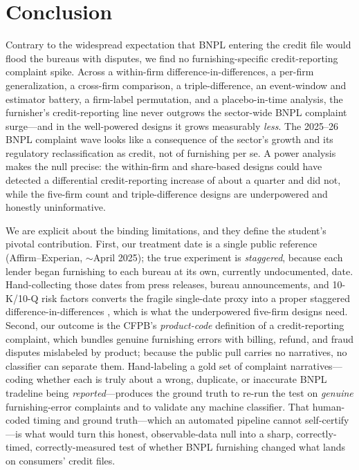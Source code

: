 \documentclass[12pt]{article}
\begin{document}
\section{Conclusion}\label{sec:concl}
Contrary to the widespread expectation that BNPL entering the credit file would flood the
bureaus with disputes, we find no furnishing-specific credit-reporting complaint spike. Across a
within-firm difference-in-differences, a per-firm generalization, a cross-firm comparison, a
triple-difference, an event-window and estimator battery, a firm-label permutation, and a
placebo-in-time analysis, the furnisher's credit-reporting line never outgrows the sector-wide
BNPL complaint surge---and in the well-powered designs it grows measurably \emph{less}. The
2025--26 BNPL complaint wave looks like a consequence of the sector's growth and its regulatory
reclassification as credit, not of furnishing per se. A power analysis makes the null precise:
the within-firm and share-based designs could have detected a differential credit-reporting
increase of about a quarter and did not, while the five-firm count and triple-difference designs
are underpowered and honestly uninformative.

We are explicit about the binding limitations, and they define the student's pivotal
contribution. First, our treatment date is a single public reference (Affirm--Experian,
$\sim$April 2025); the true experiment is \emph{staggered}, because each lender began furnishing
to each bureau at its own, currently undocumented, date. Hand-collecting those dates from press
releases, bureau announcements, and 10-K/10-Q risk factors converts the fragile single-date
proxy into a proper staggered difference-in-differences \citep{callaway2021,goodmanbacon2021},
which is what the underpowered five-firm designs need. Second, our outcome is the CFPB's
\emph{product-code} definition of a credit-reporting complaint, which bundles genuine furnishing
errors with billing, refund, and fraud disputes mislabeled by product; because the public pull
carries no narratives, no classifier can separate them. Hand-labeling a gold set of complaint
narratives---coding whether each is truly about a wrong, duplicate, or inaccurate BNPL tradeline
being \emph{reported}---produces the ground truth to re-run the test on \emph{genuine}
furnishing-error complaints and to validate any machine classifier. That human-coded timing and
ground truth---which an automated pipeline cannot self-certify---is what would turn this honest,
observable-data null into a sharp, correctly-timed, correctly-measured test of whether BNPL
furnishing changed what lands on consumers' credit files.
\end{document}
